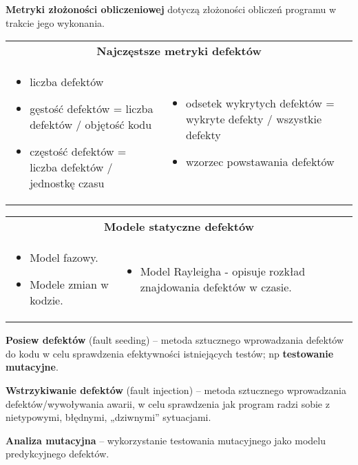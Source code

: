 \documentclass[../main.tex]{subfiles}
\begin{document}
    \textbf{Metryki złożoności obliczeniowej} dotyczą złożoności obliczeń programu w trakcie jego wykonania.

    \begin{table}[H]
        \begin{center}
            \begin{tabular}{p{8cm} p{8cm}}
                \multicolumn{2}{c}{\textbf{ Najczęstsze metryki defektów}} \\
                \begin{itemize}
                    \item liczba defektów
                    \item gęstość defektów = liczba defektów / objętość kodu
                    \item częstość defektów = liczba defektów / jednostkę czasu
                \end{itemize}
                &
                \begin{itemize}
                    \item odsetek wykrytych defektów = wykryte defekty / wszystkie defekty
                    \item wzorzec powstawania defektów
                \end{itemize} \\
            \end{tabular}
        \end{center}
    \end{table}

    \begin{table}[H]
        \begin{center}
            \begin{tabular}{p{8cm} p{8cm}}
                \multicolumn{2}{c}{\textbf{Modele statyczne defektów}} \\
                \begin{itemize}
                    \item Model fazowy.
                    \item Modele zmian w kodzie.
                \end{itemize}
                &
                \begin{itemize}
                    \item Model Rayleigha - opisuje rozkład znajdowania defektów w czasie.
                \end{itemize}
            \end{tabular}
        \end{center}
    \end{table}

    \textbf{Posiew defektów} (fault seeding) – metoda sztucznego wprowadzania defektów do kodu w
    celu sprawdzenia efektywności istniejących testów; np \textbf{testowanie mutacyjne}.

    \textbf{Wstrzykiwanie defektów} (fault injection) – metoda sztucznego wprowadzania defektów/wywoływania
    awarii, w celu sprawdzenia jak program radzi sobie z nietypowymi, błędnymi, „dziwnymi” sytuacjami.

    \textbf{Analiza mutacyjna} – wykorzystanie testowania mutacyjnego jako modelu predykcyjnego defektów.
\end{document}

